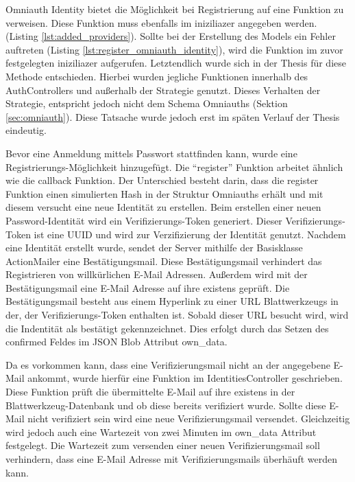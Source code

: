 \begin{description}
	 
	
	Omniauth Identity bietet die Möglichkeit bei Registrierung auf eine Funktion zu verweisen. Diese Funktion muss ebenfalls im iniziliazer angegeben werden. (Listing \ref{lst:added_providers}). Sollte bei der Erstellung des Models ein Fehler auftreten (Listing \ref{lst:register_omniauth_identity}), wird die Funktion im zuvor festgelegten iniziliazer aufgerufen. Letztendlich wurde sich in der Thesis für diese Methode entschieden. Hierbei wurden jegliche Funktionen innerhalb des AuthControllers und außerhalb der Strategie genutzt. Dieses Verhalten der Strategie, entspricht jedoch nicht dem Schema Omniauths (Sektion \ref{sec:omniauth}). Diese Tatsache wurde jedoch erst im späten Verlauf der Thesis eindeutig.

	Bevor eine Anmeldung mittels Passwort stattfinden kann, wurde eine Registrierungs-Möglichkeit hinzugefügt. Die \enquote{register} Funktion arbeitet ähnlich wie die callback Funktion. Der Unterschied besteht darin, dass die register Funktion einen simulierten Hash in der Struktur Omniauths erhält und mit diesem versucht eine neue Identität zu erstellen. Beim erstellen einer neuen Password-Identität wird ein Verifizierungs-Token generiert. Dieser Verifizierungs-Token ist eine \gls{UUID} und wird zur Verzifizierung der Identität genutzt. Nachdem eine Identität erstellt wurde, sendet der Server mithilfe der Basisklasse ActionMailer eine Bestätigungsmail. Diese Bestätigungsmail verhindert das Registrieren von willkürlichen E-Mail Adressen. Außerdem wird  mit der Bestätigungsmail eine E-Mail Adresse auf ihre existens geprüft. Die Bestätigungsmail besteht aus einem Hyperlink zu einer \gls{URL} Blattwerkzeugs in der, der Verifizierungs-Token enthalten ist. Sobald dieser \gls{URL} besucht wird, wird die Indentität als bestätigt gekennzeichnet. Dies erfolgt durch das Setzen des confirmed Feldes im JSON Blob Attribut own\_data.

	Da es vorkommen kann, dass eine Verifizierungsmail nicht an der angegebene E-Mail ankommt, wurde hierfür eine Funktion im IdentitiesController geschrieben. Diese Funktion prüft die übermittelte E-Mail auf ihre existens in der Blattwerkzeug-Datenbank und ob diese bereits verifiziert wurde. Sollte diese E-Mail nicht verifiziert sein wird eine neue Verifizierungsmail versendet. Gleichzeitig wird jedoch auch eine Wartezeit von zwei Minuten im own\_data Attribut festgelegt. Die Wartezeit zum versenden einer neuen Verifizierungsmail soll verhindern, dass eine E-Mail Adresse mit Verifizierungsmails überhäuft werden kann.


\end{description}
